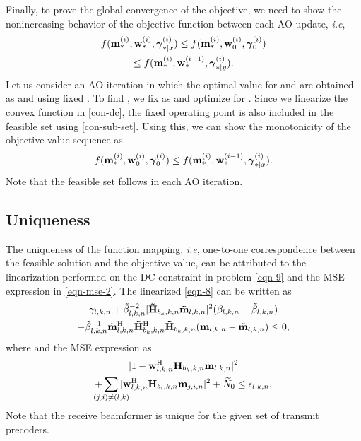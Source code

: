 Finally, to prove the global convergence of the objective, we need to show the nonincreasing behavior of the objective function between each \ac{AO} update, \textit{i.e}, 
\begin{multline}
f({\mathbf{m}}_{\ast}^{(i)},{\mathbf{w}}_{\ast}^{(i)},{{\boldsymbol{\gamma}}}_{\ast|x}^{(i)}) \leq f({\mathbf{m}}_{\ast}^{(i)},{\mathbf{w}}_{0}^{(i)},{{\boldsymbol{\gamma}}}_{0}^{(i)}) \\
\leq f({\mathbf{m}}_{\ast}^{(i)},{\mathbf{w}}_{\ast}^{(i-1)},{{\boldsymbol{\gamma}}}_{\ast|y}^{(i)}).
\end{multline}
Let us consider an \ac{AO} iteration  in which the optimal value for \eqn{\mx} and \eqn{\mz} are obtained as  and  using fixed . To find , we fix \eqn{\mx} as  and optimize for \me{\my}. Since we linearize the convex function in \eqref{con-dc}, the fixed operating point is also included in the feasible set  using \eqref{con-sub-set}. Using this, we can show the monotonicity of the objective value sequence as
\begin{equation*}
f({\mathbf{m}}_{\ast}^{(i)},{\mathbf{w}}_{0}^{(i)},{{\boldsymbol{\gamma}}}_{0}^{(i)}) \leq f({\mathbf{m}}_{\ast}^{(i)},{\mathbf{w}}_{\ast}^{(i-1)},{{\boldsymbol{\gamma}}}_{\ast|x}^{(i)}).
\end{equation*}
Note that the feasible set follows  in each \ac{AO} iteration.

\subsection{Uniqueness}

The uniqueness of the function mapping, \textit{i.e}, one-to-one correspondence between the feasible solution and the objective value, can be attributed to the linearization performed on the \ac{DC} constraint in problem \eqref{eqn-9} and the \ac{MSE} expression in \eqref{eqn-mse-2}. The linearized \eqref{eqn-8} can be written as
\begin{multline}
\gamma_{l,k,n} + \tilde{\beta}_{l,k,n}^{-2} |\mathbf{\tilde{H}}_{b_k,k,n} \mathbf{\tilde{m}}_{l,k,n}|^2 (\beta_{l,k,n} - \tilde{\beta}_{l,k,n}) \\
- \tilde{\beta}_{l,k,n}^{-1} \mathbf{\tilde{m}}_{l,k,n}^{\mathrm{H}} \mathbf{\tilde{H}}_{b_k,k,n}^{\mathrm{H}} \mathbf{\tilde{H}}_{b_k,k,n} (\mathbf{m}_{l,k,n} - \mathbf{\tilde{m}}_{l,k,n}) \leq 0,
\end{multline}
where  and the \ac{MSE} expression as
\begin{multline}
| 1 - \mvec{w}{l,k,n}^\herm \mvec{H}{b_k,k,n} \mvec{m}{l,k,n} |^2 \\ + \sum_{\mathclap{(j,i) \neq (l,k)}} | \mvec{w}{l,k,n}^\herm \mvec{H}{b_i,k,n} \mvec{m}{j,i,n} |^2 + \enoise \leq \epsilon_{l,k,n}.
\end{multline}
Note that the receive beamformer  is unique for the given set of transmit precoders.

